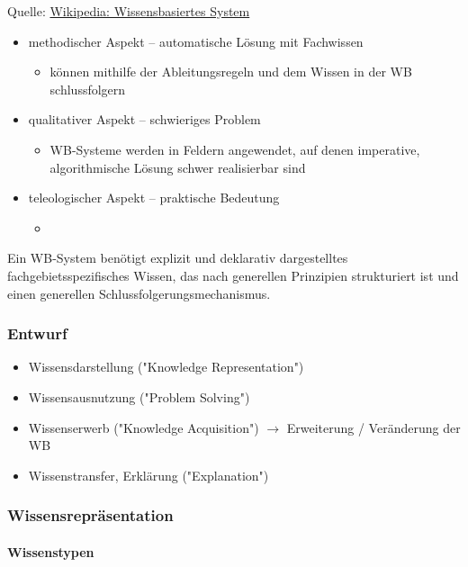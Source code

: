 \documentclass[runningheads,deutsch]{llncs}
\begin{document}
Quelle: \href{https://de.wikipedia.org/wiki/Wissensbasiertes_System}{Wikipedia: Wissensbasiertes System}

\pagebreak

\begin{itemize}
    \item methodischer Aspekt -- automatische Lösung mit Fachwissen
    \begin{itemize}
        \item können mithilfe der Ableitungsregeln und dem Wissen in der WB schlussfolgern
    \end{itemize}
    \item qualitativer Aspekt -- schwieriges Problem
    \begin{itemize}
        \item WB-Systeme werden in Feldern angewendet, auf denen imperative, algorithmische Lösung schwer realisierbar sind
    \end{itemize}
    \item teleologischer Aspekt -- praktische Bedeutung
    \begin{itemize}
        \item 
    \end{itemize}
\end{itemize}

Ein WB-System benötigt explizit und deklarativ dargestelltes fachgebietsspezifisches Wissen, das nach generellen Prinzipien strukturiert ist und einen generellen Schlussfolgerungsmechanismus.

\subsubsection{Entwurf}
\begin{itemize}
    \item Wissensdarstellung ("Knowledge Representation")
    \item Wissensausnutzung ("Problem Solving")
    \item Wissenserwerb ("Knowledge Acquisition") $\rightarrow$ Erweiterung / Veränderung der WB
    \item Wissenstransfer, Erklärung ("Explanation")
\end{itemize}

\subsubsection{Wissensrepräsentation}
\paragraph{Wissenstypen}
\end{document}
